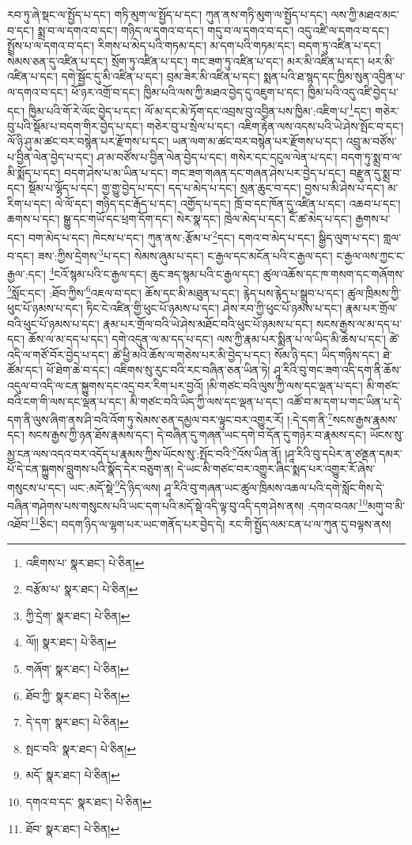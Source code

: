 རབ་ཏུ་ཞེ་སྡང་ལ་སྤྱོད་པ་དང་། གཏི་མུག་ལ་སྤྱོད་པ་དང་། ཀུན་ནས་གཏི་མུག་ལ་སྤྱོད་པ་དང་། ལས་ཀྱི་མཐའ་མང་བ་དང་། སྨྲ་བ་ལ་དགའ་བ་དང་། གཉིད་ལ་དགའ་བ་དང་། གདུ་བ་ལ་དགའ་བ་དང་། འདུ་འཛི་ལ་དགའ་བ་དང་། སྤྲོས་པ་ལ་དགའ་བ་དང་། རིགས་པ་མེད་པའི་གཏམ་དང་། མ་དག་པའི་གཏམ་དང་། བདག་ཏུ་འཛིན་པ་དང་། སེམས་ཅན་དུ་འཛིན་པ་དང་། སྲོག་ཏུ་འཛིན་པ་དང་། གང་ཟག་ཏུ་འཛིན་པ་དང་། མར་མི་འཛིན་པ་དང་། ཕར་མི་འཛིན་པ་དང་། དགེ་སྦྱོང་དུ་མི་འཛིན་པ་དང་། བྲམ་ཟེར་མི་འཛིན་པ་དང་། སྨན་པའི་ཐ་སྙད་དང་ཁྱིམ་སུན་འབྱིན་པ་ལ་དགའ་བ་དང་། ཕོ་ཉར་འགྲོ་བ་དང་། ཁྱིམ་པའི་ལས་ཀྱི་མཐའ་བྱེད་དུ་འཇུག་པ་དང་། ཁྱིམ་པའི་འདུ་འཛི་བྱེད་པ་དང་། ཁྱིམ་པའི་གོ་རེ་ལོང་བྱེད་པ་དང་། ལོ་མ་དང་མེ་ཏོག་དང་འབྲས་བུ་འབྱིན་པས་ཁྱིམ་:འཇིག་པ་\footnote{འཇིགས་པ་  སྣར་ཐང་།  པེ་ཅིན། }དང་། གཅེར་བུ་པའི་སྡོམ་པ་བདག་གིར་བྱེད་པ་དང་། གཅེར་བུ་པ་སྲེལ་པ་དང་། འཇིག་རྟེན་ལས་འདས་པའི་ཡེ་ཤེས་སྤོང་བ་དང་། ལོ་ཉི་ཤུ་མ་ཚང་བར་བསྙེན་པར་རྫོགས་པ་དང་། ཡན་ལག་མ་ཚང་བར་བསྙེན་པར་རྫོགས་པ་དང་། འབྲུ་མ་བཙོས་པ་བྱིན་ལེན་བྱེད་པ་དང་། ཤ་མ་བཙོས་པ་བྱིན་ལེན་བྱེད་པ་དང་། གསེར་དང་དངུལ་ལེན་པ་དང་། བདག་ཏུ་སྨྲ་བ་ལ་མི་སྨོད་པ་དང་། བདག་ཤེས་པ་མ་ཡིན་པ་དང་། གང་ཟག་གཞན་དང་གཞན་ཤེས་པར་བྱེད་པ་དང་། བརྫུན་དུ་སྨྲ་བ་དང་། སྡོམ་པ་ལྷོད་པ་དང་། གྱ་གྱུ་བྱེད་པ་དང་། དད་པ་མེད་པ་དང་། སྲན་ཆུང་བ་དང་། བྱས་པ་མི་ཤེས་པ་དང་། མ་རིག་པ་དང་། ལེ་ལོ་དང་། གཉིད་དང་རྒོད་པ་དང་། འགྱོད་པ་དང་། ཁྲོ་བ་དང་ཁོན་དུ་འཛིན་པ་དང་། འཆབ་པ་དང་། ཆགས་པ་དང་། སྒྱུ་དང་གཡོ་དང་ཕྲག་དོག་དང་། སེར་སྣ་དང་། ཁྲེལ་མེད་པ་དང་། ངོ་ཚ་མེད་པ་དང་། རྒྱགས་པ་དང་། བག་མེད་པ་དང་། ཁེངས་པ་དང་། ཀུན་ནས་:རྩོམ་པ་\footnote{བརྩོམ་པ་  སྣར་ཐང་།  པེ་ཅིན། }དང་། དགའ་བ་མེད་པ་དང་། སྒྱིད་ལུག་པ་དང་། གླལ་བ་དང་། ཟས་:ཀྱིས་དྲེགས་\footnote{ཀྱི་དྲེག་  སྣར་ཐང་།  པེ་ཅིན། }པ་དང་། སེམས་ཞུམ་པ་དང་། ང་རྒྱལ་དང་མངོན་པའི་ང་རྒྱལ་དང་། ང་རྒྱལ་ལས་ཀྱང་ང་རྒྱལ་:དང་། \footnote{ལོ།།   སྣར་ཐང་།  པེ་ཅིན། }ངའོ་སྙམ་པའི་ང་རྒྱལ་དང་། ཆུང་ཟད་སྙམ་པའི་ང་རྒྱལ་དང་། ཚུལ་འཆོས་དང་ཁ་གསག་དང་གཞོགས་\footnote{གཞོག་  སྣར་ཐང་།  པེ་ཅིན། }སློང་དང་། :ཐོབ་ཀྱིས་\footnote{ཐོབ་ཀྱི་  སྣར་ཐང་།  པེ་ཅིན། }འཇལ་བ་དང་། ཆོས་དང་མི་མཐུན་པ་དང་། རྙེད་པས་རྙེད་པ་སྒྲུབ་པ་དང་། ཚུལ་ཁྲིམས་ཀྱི་ཕུང་པོ་ཉམས་པ་དང་། ཏིང་ངེ་འཛིན་གྱི་ཕུང་པོ་ཉམས་པ་དང་། ཤེས་རབ་ཀྱི་ཕུང་པོ་ཉམས་པ་དང་། རྣམ་པར་གྲོལ་བའི་ཕུང་པོ་ཉམས་པ་དང་། རྣམ་པར་གྲོལ་བའི་ཡེ་ཤེས་མཐོང་བའི་ཕུང་པོ་ཉམས་པ་དང་། སངས་རྒྱས་ལ་མ་དད་པ་དང་། ཆོས་ལ་མ་དད་པ་དང་། དགེ་འདུན་ལ་མ་དད་པ་དང་། ལས་ཀྱི་རྣམ་པར་སྨིན་པ་ལ་ཡིད་མི་ཆེས་པ་དང་། ཚེ་འདི་ལ་གཙོ་བོར་བྱེད་པ་དང་། ཚེ་ཕྱི་མའི་ཆོས་ལ་གཅེས་པར་མི་བྱེད་པ་དང་། སོམ་ཉི་དང་། ཡིད་གཉིས་དང་། ཐེ་ཚོམ་དང་། ཕོ་ཐེག་ཆེ་བ་དང་། འཇིགས་སུ་རུང་བའི་རང་བཞིན་ཅན་ཡིན་ཏེ། ཤཱ་རིའི་བུ་གང་ཟག་འདི་དག་ནི་ཆོས་འདུལ་བ་འདི་ལ་ངན་སྐྱུགས་དང་འདྲ་བར་རིག་པར་བྱའོ། །མི་གཙང་བའི་ལུས་ཀྱི་ལས་དང་ལྡན་པ་དང་། མི་གཙང་བའི་ངག་གི་ལས་དང་ལྡན་པ་དང་། མི་གཙང་བའི་ཡིད་ཀྱི་ལས་དང་ལྡན་པ་དང་། འཚོ་བ་མ་དག་པ་གང་ཡིན་པ་དེ་དག་ནི་ལུས་ཞིག་ནས་ཤི་བའི་འོག་ཏུ་སེམས་ཅན་དམྱལ་བར་ལྟུང་བར་འགྱུར་རོ། །:དེ་དག་ནི་\footnote{དེ་དག་  སྣར་ཐང་།  པེ་ཅིན། }སངས་རྒྱས་རྣམས་དང་། སངས་རྒྱས་ཀྱི་ཉན་ཐོས་རྣམས་དང་། དེ་བཞིན་དུ་གཞན་ཡང་དགེ་བ་དོན་དུ་གཉེར་བ་རྣམས་དང་། ཡོངས་སུ་མྱ་ངན་ལས་འདའ་བར་འདོད་པ་རྣམས་ཀྱིས་ཡོངས་སུ་:སྤོང་བའི་\footnote{སྤང་བའི་  སྣར་ཐང་།  པེ་ཅིན། }འོས་ཡིན་ནོ། །ཤཱ་རིའི་བུ་དཔེར་ན་ཙནྡན་དམར་པོ་དེ་ངན་སྐྱུགས་བླུགས་པའི་སྣོད་དེར་བཅུག་ན། དེ་ཡང་མི་གཙང་བར་འགྱུར་ཞིང་སྨད་པར་འགྱུར་རོ་ཞེས་གསུངས་པ་དང་། ཡང་:མདོ་སྡེ་\footnote{མདོ་  སྣར་ཐང་།  པེ་ཅིན། }དེ་ཉིད་ལས། ཤཱ་རིའི་བུ་གཞན་ཡང་ཚུལ་ཁྲིམས་འཆལ་པའི་དགེ་སློང་གིས་དེ་བཞིན་གཤེགས་པས་གསུངས་པའི་ཡང་དག་པའི་མདོ་སྡེ་འདི་ལྟ་བུ་འདི་དག་ཤེས་ནས། :དགའ་བའམ་\footnote{དགའ་བ་དང་  སྣར་ཐང་།  པེ་ཅིན། }མགུ་བ་མི་འཐོབ་\footnote{ཐོབ་  སྣར་ཐང་།  པེ་ཅིན། }ཅིང་། བདག་ཉིད་ལ་ལྷག་པར་ཡང་གནོད་པར་བྱེད་དེ། རང་གི་སྤྱོད་ལམ་ངན་པ་ལ་ཀུན་དུ་བལྟས་ནས། 